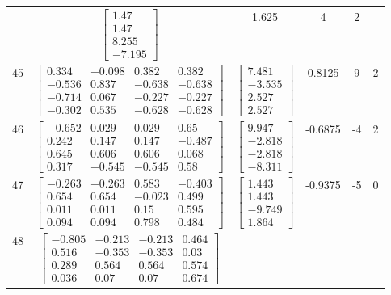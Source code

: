 \documentclass[a4paper,12pt]{article}
\begin{document}
\begin{tabular}{c c c c c c}
&
$\begin{bmatrix} 1.47 \\ 1.47 \\ 8.255 \\ -7.195 \end{bmatrix}$
&
1.625
&
4
&
2
\\
45
&
$\begin{bmatrix} 0.334 & -0.098 & 0.382 & 0.382 \\ -0.536 & 0.837 & -0.638 & -0.638 \\ -0.714 & 0.067 & -0.227 & -0.227 \\ -0.302 & 0.535 & -0.628 & -0.628 \end{bmatrix}$
&
$\begin{bmatrix} 7.481 \\ -3.535 \\ 2.527 \\ 2.527 \end{bmatrix}$
&
0.8125
&
9
&
2
\\
46
&
$\begin{bmatrix} -0.652 & 0.029 & 0.029 & 0.65 \\ 0.242 & 0.147 & 0.147 & -0.487 \\ 0.645 & 0.606 & 0.606 & 0.068 \\ 0.317 & -0.545 & -0.545 & 0.58 \end{bmatrix}$
&
$\begin{bmatrix} 9.947 \\ -2.818 \\ -2.818 \\ -8.311 \end{bmatrix}$
&
-0.6875
&
-4
&
2
\\
47
&
$\begin{bmatrix} -0.263 & -0.263 & 0.583 & -0.403 \\ 0.654 & 0.654 & -0.023 & 0.499 \\ 0.011 & 0.011 & 0.15 & 0.595 \\ 0.094 & 0.094 & 0.798 & 0.484 \end{bmatrix}$
&
$\begin{bmatrix} 1.443 \\ 1.443 \\ -9.749 \\ 1.864 \end{bmatrix}$
&
-0.9375
&
-5
&
0
\\
48
&
$\begin{bmatrix} -0.805 & -0.213 & -0.213 & 0.464 \\ 0.516 & -0.353 & -0.353 & 0.03 \\ 0.289 & 0.564 & 0.564 & 0.574 \\ 0.036 & 0.07 & 0.07 & 0.674 \end{bmatrix}$

\end{tabular}
\end{document}

